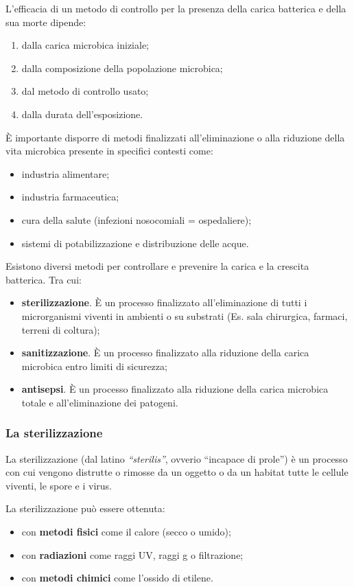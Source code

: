 \documentclass[11pt]{book}
\begin{document}
L’efficacia di un metodo di controllo per la presenza della carica batterica e della sua morte dipende:
\begin{enumerate}
\item dalla carica microbica iniziale;
\item dalla composizione della popolazione microbica;
\item dal metodo di controllo usato;
\item dalla durata dell’esposizione.
\end{enumerate}

\`E importante disporre di metodi finalizzati all’eliminazione o alla riduzione della vita microbica presente in specifici contesti come:
\begin{itemize}
\item industria alimentare;
\item industria farmaceutica;
\item cura della salute (infezioni nosocomiali = ospedaliere);
\item sistemi di potabilizzazione e distribuzione delle acque.
\end{itemize}

Esistono diversi metodi per controllare e prevenire la carica e la crescita batterica. Tra cui:
\begin{itemize}
\item \textbf{sterilizzazione}. \`E un processo finalizzato all’eliminazione di tutti i microrganismi viventi in ambienti o su substrati (Es. sala chirurgica, farmaci, terreni di coltura);
\item \textbf{sanitizzazione}. \`E un processo finalizzato alla riduzione della carica microbica entro limiti di sicurezza;
\item \textbf{antisepsi}. \`E un processo finalizzato alla riduzione della carica microbica totale e all’eliminazione dei patogeni.
\end{itemize}


\subsubsection{La sterilizzazione}
La sterilizzazione (dal latino \emph{``sterilis''}, ovverio ``incapace di prole'') è un processo con cui vengono distrutte o rimosse da un oggetto o da un habitat tutte le cellule viventi, le spore e i virus.

La sterilizzazione può essere ottenuta: 
\begin{itemize}
\item con \textbf{metodi fisici} come il calore (secco o umido); 
\item con \textbf{radiazioni} come raggi UV, raggi g o filtrazione;
\item con \textbf{metodi chimici} come l'ossido di etilene.
\end{itemize}
\end{document}
